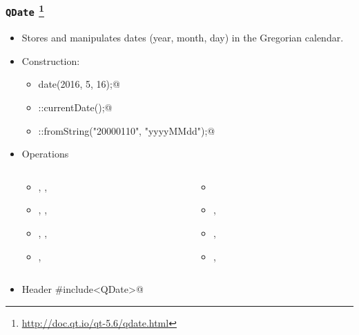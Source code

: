 \begin{frame}[fragile]
  \frametitle{\texttt{QDate}
    \footnote{\url{http://doc.qt.io/qt-5.6/qdate.html}}}
  \small
  \begin{itemize}
    \item Stores and manipulates dates (year, month, day) in the Gregorian
      calendar.
    \item Construction:
    \begin{itemize}
      \footnotesize
      \item \verb@QDate date(2016, 5, 16);@
      \item \verb@QDate::currentDate();@
      \item \verb@QDate::fromString("20000110", "yyyyMMdd");@
    \end{itemize}
    \item Operations
    \begin{columns}
      \scriptsize
      \begin{column}{0.4\textwidth}
      \begin{itemize}
        \item \verb@year@, \verb@month@, \verb@day@
        \item \verb@addYears@, \verb@addMonths@, \verb@addDays@
        \item \verb@weekNumber@, \verb@dayOfWeek@, \verb@dayOfYear@
        \item \verb@daysInMonth@, \verb@daysInYear@
      \end{itemize}
      \end{column}
      \begin{column}{0.4\textwidth}
      \begin{itemize}
        \item \verb@isLeapYear@
        \item \verb@isValid@, \verb@isNull@
        \item \verb@shortDayName@, \verb@longDayName@
        \item \verb@shortMonthName@, \verb@longMonthName@
      \end{itemize}
      \end{column}
    \end{columns}
    \item Header \verb@#include<QDate>@
  \end{itemize}
\end{frame}

